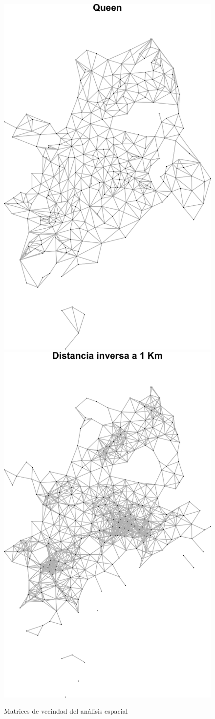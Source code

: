 \documentclass[12pt,]{book}
\begin{document}
\begin{figure}

{\centering \includegraphics[width=0.48\linewidth]{tesis-unigis_files/figure-latex/ws-su-reg-1} \includegraphics[width=0.48\linewidth]{tesis-unigis_files/figure-latex/ws-su-reg-2} 

}

\caption{Matrices de vecindad del análisis espacial}\label{fig:ws-su-reg}
\end{figure}
\end{document}
